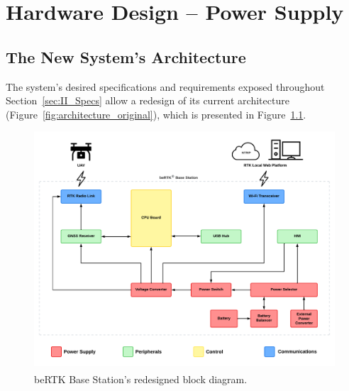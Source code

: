 

\chapter{Hardware Design -- Power Supply}\label{cha:chapter3_HardwareDesign}


\section{The New System's Architecture}\label{sec:31_Architecture}

The system's desired specifications and requirements exposed throughout Section~\ref{sec:II_Specs} allow a redesign of its current architecture (Figure~\ref{fig:architecture_original}), which is presented in Figure~\ref{fig:architecture_new}.

\begin{figure}[h]
	\centering
	\includegraphics[width=1.0\textwidth]{Chapters/Figures/new_architecture_2.pdf}
	\caption{beRTK\textsuperscript{\textregistered} Base Station's redesigned block diagram.}
	\label{fig:architecture_new}
\end{figure}

